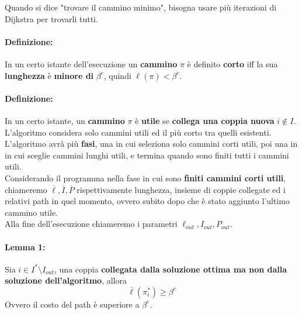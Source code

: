 \newpage

Quando si dice "trovare il cammino minimo", bisogna usare più iterazioni di Dijkstra per trovarli tutti.\\

\paragraph{Definizione:} In un certo istante dell'esecuzione un \textbf{cammino} $\pi$ è definito \textbf{corto} iff la sua \textbf{lunghezza} è \textbf{minore di} $\beta^c$, quindi $\ell(\pi) < \beta^c$. \\

\paragraph{Definizione:} In un certo istante, un \textbf{cammino} $\pi$ è \textbf{utile} se \textbf{collega una coppia nuova} $i \notin I$. L'algoritmo considera solo cammini utili ed il più corto tra quelli esistenti.\\

L'algoritmo avrà più \textbf{fasi}, una in cui seleziona solo cammini corti utili, poi una in in cui sceglie cammini lunghi utili, e termina quando sono finiti tutti i cammini utili.\\

Considerando il programma nella fase in cui sono \textbf{finiti cammini corti utili}, chiameremo $\overline{\ell}, \overline{I}, \overline{P}$ rispettivamente lunghezza, insieme di coppie collegate ed i relativi path in quel momento, ovvero subito dopo che è stato aggiunto l'ultimo cammino utile.\\
Alla fine dell'esecuzione chiameremo i parametri $\ell_{out}, I_{out}, P_{out}$.\\

\paragraph{Lemma 1:} Sia $i \in I^\ast \setminus I_{out}$, una coppia \textbf{collegata dalla soluzione ottima ma non dalla soluzione dell'algoritmo}, allora 
$$\overline{\ell} (\pi_i^\ast) \geq \beta^c$$
Ovvero il costo del path è superiore a $\beta^c$. \\

